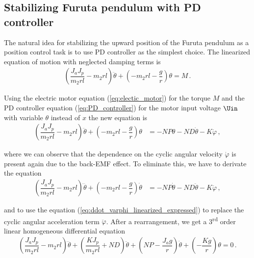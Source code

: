 
\subsection{Stabilizing Furuta pendulum with PD controller}

The natural idea for stabilizing the upward position of the Furuta pendulum as a position control  task is to use PD controller as the simplest choice. 
The linearized equation of motion with neglected damping terms is
\begin{align}
		\left(\dfrac{J_a J_p}{m_2 r l}- m_2 r l\right) \ddot \theta + \left(-m_2 r l - \dfrac{g}{r}\right) \theta = M\,. 
		\label{eq:lienarized_essential_equation_wo_damping}
\end{align}

\noindent Using the electric motor equation (\ref{eq:electic_motor}) for the torque $M$ and the PD controller equation (\ref{eq:PD_controller}) for the motor input voltage $\Uin$ with variable $\theta$ instead of $x$ the new equation is
%
\begin{align}
	\left(\dfrac{J_a J_p}{m_2 r l}- m_2 r l\right) \ddot \theta + \left(-m_2 r l - \dfrac{g}{r}\right) \theta &=  -NP\theta -ND\dot{\theta} -K\dot{\varphi}\,,
\end{align}

\noindent
where we can observe that the dependence on the cyclic angular velocity $\dot \varphi$ is present again due to the back-EMF effect. To eliminate this, we have to derivate the equation 
\begin{align}
 	\left(\dfrac{J_a J_p}{m_2 r l}- m_2 r l\right) \dddot \theta + \left(-m_2 r l - \dfrac{g}{r}\right) \dot \theta &= -NP\dot \theta -ND\ddot{\theta} -K\ddot{\varphi}\,,
\end{align}

\noindent
and to use the equation (\ref{eq:ddot_varphi_linearized_expressed}) to replace the cyclic angular acceleration term $\ddot \varphi$. After a rearrangement, we get a 3\textsuperscript{rd} order linear homogeneous differential equation
\begin{align}
	\left(\dfrac{J_a J_p}{m_2 r l}- m_2 r l\right) \dddot \theta 
	+
	\left(\dfrac{KJ_p}{m_2 r l} + ND\right) \ddot\theta
	+
	 \left(NP - \dfrac{J_a g}{r}\right) \dot \theta
	+
	\left(-\dfrac{Kg}{r}\right) \theta = 0\,. \label{eq:PD_diffeq}
\end{align}

